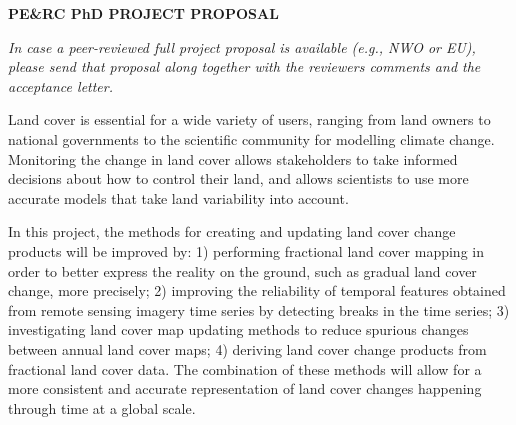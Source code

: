 \documentclass[10pt]{article}
\begin{document}
\newpage

\begin{center}{\large\textbf{PE\&RC PhD PROJECT PROPOSAL}}

\textit{In case a peer-reviewed full project proposal is available (e.g., NWO or EU), please send that proposal along together with the reviewers comments and the acceptance letter.}\end{center}

\begin{mdframed}[style=table,frametitle=\textbf{6. SUMMARY} (max. 250 words)]

Land cover is essential for a wide variety of users, ranging from land owners to national governments to the scientific community for modelling climate change. Monitoring the change in land cover allows stakeholders to take informed decisions about how to control their land, and allows scientists to use more accurate models that take land variability into account.

In this project, the methods for creating and updating land cover change products will be improved by: 1) performing fractional land cover mapping in order to better express the reality on the ground, such as gradual land cover change, more precisely; 2) improving the reliability of temporal features obtained from remote sensing imagery time series by detecting breaks in the time series; 3) investigating land cover map updating methods to reduce spurious changes between annual land cover maps; 4) deriving land cover change products from fractional land cover data. The combination of these methods will allow for a more consistent and accurate representation of land cover changes happening through time at a global scale.
\end{mdframed}
\end{document}
